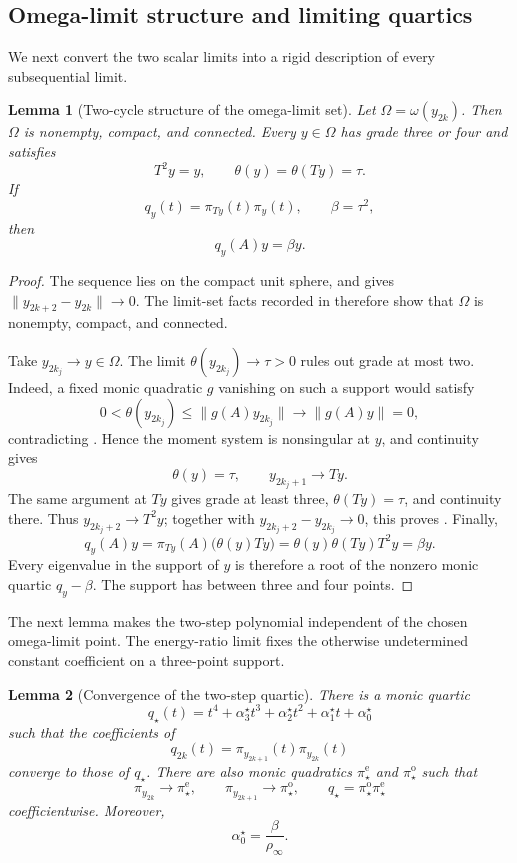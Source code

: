 \documentclass[11pt]{article}
\newtheorem{lemma}{Lemma}[section]
\begin{document}
\subsection{Omega-limit structure and limiting quartics}

We next convert the two scalar limits into a rigid description of every
subsequential limit.

\begin{lemma}[Two-cycle structure of the omega-limit set]
\label{lem:omega-structure}
Let \(\Omega=\omega(y_{2k})\).
Then \(\Omega\) is nonempty, compact, and connected.  Every
\(y\in\Omega\) has grade three or four and satisfies
\[
 T^2y=y,\qquad \theta(y)=\theta(Ty)=\tau.
\tag{7}\label{eq:omega-two-cycle}
\]
If
\[
 q_y(t)=\pi_{Ty}(t)\pi_y(t),\qquad \beta=\tau^2,
\]
then
\[
 q_y(A)y=\beta y.
\tag{8}\label{eq:omega-quartic-eigen}
\]
\end{lemma}

\begin{proof}
The sequence lies on the compact unit sphere, and
 gives
\(\lVert y_{2k+2}-y_{2k}\rVert\to0\).  The limit-set facts recorded in
 therefore show that \(\Omega\) is nonempty,
compact, and connected.

Take \(y_{2k_j}\to y\in\Omega\).  The limit
\(\theta(y_{2k_j})\to\tau>0\) rules out grade at most two.  Indeed, a fixed
monic quadratic \(g\) vanishing on such a support would satisfy
\[
 0<\theta(y_{2k_j})\leq\lVert g(A)y_{2k_j}\rVert
 \longrightarrow\lVert g(A)y\rVert=0,
\]
contradicting .  Hence the moment system is
nonsingular at \(y\), and continuity gives
\[
 \theta(y)=\tau,\qquad y_{2k_j+1}\to Ty.
\]
The same argument at \(Ty\) gives grade at least three,
\(\theta(Ty)=\tau\), and continuity there.  Thus
\(y_{2k_j+2}\to T^2y\); together with
\(y_{2k_j+2}-y_{2k_j}\to0\), this proves
.  Finally,
\[
 q_y(A)y
 =\pi_{Ty}(A)\bigl(\theta(y)Ty\bigr)
 =\theta(y)\theta(Ty)T^2y
 =\beta y.
\]
Every eigenvalue in the support of \(y\) is therefore a root of the
nonzero monic quartic \(q_y-\beta\).  The support has between three and
four points.
\end{proof}

The next lemma makes the two-step polynomial independent of the chosen
omega-limit point.  The energy-ratio limit fixes the otherwise undetermined
constant coefficient on a three-point support.

\begin{lemma}[Convergence of the two-step quartic]
\label{lem:quartic-convergence}
There is a monic quartic
\[
 q_\star(t)=t^4+\alpha_3^\star t^3+\alpha_2^\star t^2
             +\alpha_1^\star t+\alpha_0^\star
\]
such that the coefficients of
\[
 q_{2k}(t)=\pi_{y_{2k+1}}(t)\pi_{y_{2k}}(t)
\]
converge to those of \(q_\star\).  There are also monic quadratics
\(\pi_\star^{\mathrm e}\) and \(\pi_\star^{\mathrm o}\) such that
\[
 \pi_{y_{2k}}\longrightarrow\pi_\star^{\mathrm e},\qquad
 \pi_{y_{2k+1}}\longrightarrow\pi_\star^{\mathrm o},\qquad
 q_\star=\pi_\star^{\mathrm o}\pi_\star^{\mathrm e}
\]
coefficientwise.  Moreover,
\[
 \alpha_0^\star=\frac{\beta}{\rho_\infty}.
\tag{9}\label{eq:quartic-constant}
\]
\end{lemma}
\end{document}
